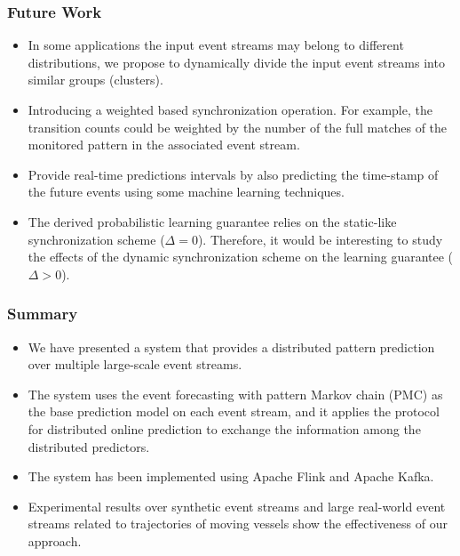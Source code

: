 \begin{frame}
	
	\frametitle{Future Work}
	\begin{itemize}
		\item<only@1> In some applications the input event streams may belong to different distributions, we propose to dynamically divide the input event streams into similar groups (clusters).
		
		\item<only@1> Introducing a weighted based synchronization operation. For example, the transition counts could be weighted by the number of the full matches of the monitored pattern in the associated event stream. 
		
		\item<only@2> Provide real-time predictions intervals by also predicting the time-stamp of the future events using some machine learning techniques.  
		
		\item<only@2>  The derived probabilistic learning guarantee  relies on the static-like synchronization scheme  ($\Delta=0$). Therefore, it would be interesting to study the effects of the dynamic synchronization scheme on the learning guarantee ($\Delta > 0$).
	\end{itemize}
	
\end{frame}

\begin{frame}
	
	\frametitle{Summary }
	\begin{itemize}
		\item<only@1> We have presented a system that provides a distributed pattern prediction over multiple large-scale event streams.
		
		\item<only@1> The system uses the event forecasting with pattern Markov chain (PMC) \cite{alevizos2017event} as the base prediction model on each event stream, and it applies the protocol for distributed online prediction \cite{kamp2014communication} to exchange the information among the distributed predictors.
		
		\item<only@1> The system has been implemented using Apache Flink and Apache Kafka.
		
		\item<only@1> Experimental results over synthetic event streams and large real-world event streams related to trajectories of moving vessels show the effectiveness of our approach.
		
	\end{itemize}
	
\end{frame}